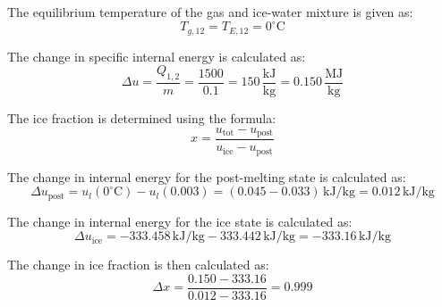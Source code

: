 The equilibrium temperature of the gas and ice-water mixture is given as:  
\[
T_{g,12} = T_{E,12} = 0^\circ\text{C}
\]  

The change in specific internal energy is calculated as:  
\[
\Delta u = \frac{Q_{1,2}}{m} = \frac{1500}{0.1} = 150 \, \frac{\text{kJ}}{\text{kg}} = 0.150 \, \frac{\text{MJ}}{\text{kg}}
\]  

The ice fraction is determined using the formula:  
\[
x = \frac{u_{\text{tot}} - u_{\text{post}}}{u_{\text{ice}} - u_{\text{post}}}
\]  

The change in internal energy for the post-melting state is calculated as:  
\[
\Delta u_{\text{post}} = u_l(0^\circ\text{C}) - u_l(0.003) = (0.045 - 0.033) \, \text{kJ/kg} = 0.012 \, \text{kJ/kg}
\]  

The change in internal energy for the ice state is calculated as:  
\[
\Delta u_{\text{ice}} = -333.458 \, \text{kJ/kg} - 333.442 \, \text{kJ/kg} = -333.16 \, \text{kJ/kg}
\]  

The change in ice fraction is then calculated as:  
\[
\Delta x = \frac{0.150 - 333.16}{0.012 - 333.16} = 0.999
\]